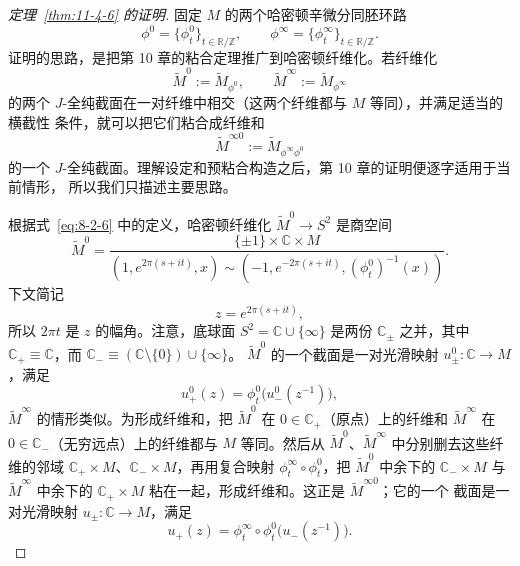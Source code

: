 \begin{proof}[定理~\ref{thm:11-4-6} 的证明]
固定 $M$ 的两个哈密顿辛微分同胚环路
\[
  \phi^0=\{\phi_t^0\}_{t\in\mathbb R/\mathbb Z},
  \qquad
  \phi^\infty=\{\phi_t^\infty\}_{t\in\mathbb R/\mathbb Z}.
\]
证明的思路，是把第 10 章的粘合定理推广到哈密顿纤维化。若纤维化
\[
  \widetilde M^0:=\widetilde M_{\phi^0},
  \qquad
  \widetilde M^\infty:=\widetilde M_{\phi^\infty}
\]
的两个 $J$-全纯截面在一对纤维中相交（这两个纤维都与 $M$ 等同），并满足适当的横截性
条件，就可以把它们粘合成纤维和
\[
  \widetilde M^{\infty0}:=\widetilde M_{\phi^\infty\phi^0}
\]
的一个 $J$-全纯截面。理解设定和预粘合构造之后，第 10 章的证明便逐字适用于当前情形，
所以我们只描述主要思路。

根据式~\eqref{eq:8-2-6} 中的定义，哈密顿纤维化
$\widetilde M^0\to S^2$ 是商空间
\[
  \widetilde M^0=
  \frac{\{\pm1\}\times\mathbb C\times M}
  {(1,e^{2\pi(s+it)},x)\sim
   (-1,e^{-2\pi(s+it)},(\phi_t^0)^{-1}(x))}.
\]
下文简记
\[
  z=e^{2\pi(s+it)},
\]
所以 $2\pi t$ 是 $z$ 的幅角。注意，底球面
$S^2=\mathbb C\cup\{\infty\}$ 是两份 $\mathbb C_\pm$ 之并，其中
$\mathbb C_+\equiv\mathbb C$，而
$\mathbb C_-\equiv(\mathbb C\setminus\{0\})\cup\{\infty\}$。
$\widetilde M^0$ 的一个截面是一对光滑映射 $u_\pm^0:\mathbb C\to M$，满足
\[
  u_+^0(z)=\phi_t^0\bigl(u_-^0(z^{-1})\bigr),
\]
$\widetilde M^\infty$ 的情形类似。为形成纤维和，把 $\widetilde M^0$ 在
$0\in\mathbb C_+$（原点）上的纤维和 $\widetilde M^\infty$ 在
$0\in\mathbb C_-$（无穷远点）上的纤维都与 $M$ 等同。然后从
$\widetilde M^0$、$\widetilde M^\infty$ 中分别删去这些纤维的邻域
$\mathbb C_+\times M$、$\mathbb C_-\times M$，再用复合映射
$\phi_t^\infty\circ\phi_t^0$，把 $\widetilde M^0$ 中余下的
$\mathbb C_-\times M$ 与 $\widetilde M^\infty$ 中余下的
$\mathbb C_+\times M$ 粘在一起，形成纤维和。这正是 $\widetilde M^{\infty0}$；它的一个
截面是一对光滑映射 $u_\pm:\mathbb C\to M$，满足
\[
  u_+(z)=\phi_t^\infty\circ\phi_t^0\bigl(u_-(z^{-1})\bigr).
\]


\end{proof}
